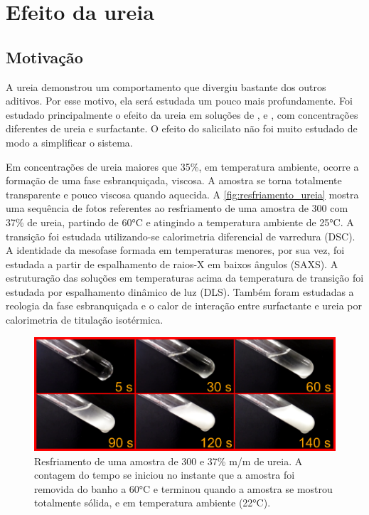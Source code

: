 \chapter{Efeito da ureia}
\label{sec:cap_efeito_ureia}

\section{Motivação}
A ureia demonstrou um comportamento que divergiu bastante dos outros aditivos. Por esse motivo, ela será estudada um pouco mais profundamente. Foi estudado principalmente o efeito da ureia em soluções de \CTAB{}, \TTAB{} e \DTAB, com concentrações diferentes de ureia e surfactante. O efeito do salicilato não foi muito estudado de modo a simplificar o sistema.

Em concentrações de ureia maiores que 35\%, em temperatura ambiente, ocorre a formação de uma fase esbranquiçada, viscosa. A amostra se torna totalmente transparente e pouco viscosa quando aquecida. A \autoref{fig:resfriamento_ureia} mostra uma sequência de fotos referentes ao resfriamento de uma amostra de \CTAB{} 300 \mM{} com 37\% de ureia, partindo de 60°C e atingindo a temperatura ambiente de 25°C. A transição foi estudada utilizando-se calorimetria diferencial de varredura (DSC). A identidade da mesofase formada em temperaturas menores, por sua vez, foi estudada a partir de espalhamento de raios-X em baixos ângulos (SAXS). A estruturação das soluções em temperaturas acima da temperatura de transição foi estudada por espalhamento dinâmico de luz (DLS). Também foram estudadas a reologia da fase esbranquiçada e o calor de interação entre surfactante e ureia por calorimetria de titulação isotérmica.

\begin{figure}[h]
	\centering
	\includegraphics[width=\textwidth]{imagens/ureia/tempos}
	\caption{Resfriamento de uma amostra de \CTAB{} 300 \mM{} e 37\% m/m de ureia. A contagem do tempo se iniciou no instante que a amostra foi removida do banho a 60°C e terminou quando a amostra se mostrou totalmente sólida, e em temperatura ambiente (22°C).}
	\label{fig:resfriamento_ureia}
\end{figure} 


